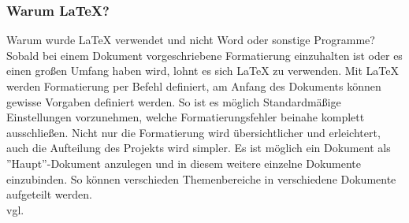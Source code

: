 \subsubsection{Warum LaTeX?}
\label{sec:WarumLaTeX} 
Warum wurde LaTeX verwendet und nicht Word oder sonstige Programme? Sobald bei einem Dokument vorgeschriebene Formatierung einzuhalten ist oder es einen großen Umfang haben wird, lohnt es sich LaTeX zu verwenden. Mit LaTeX werden Formatierung per Befehl definiert, am Anfang des Dokuments können gewisse Vorgaben definiert werden. So ist es möglich Standardmäßige Einstellungen vorzunehmen, welche Formatierungsfehler beinahe komplett ausschließen. Nicht nur die Formatierung wird übersichtlicher und erleichtert, auch die Aufteilung des Projekts wird simpler. Es ist möglich ein Dokument als ''Haupt''-Dokument anzulegen und in diesem weitere einzelne Dokumente einzubinden. So können verschieden Themenbereiche in verschiedene Dokumente aufgeteilt werden. \\vgl. \cite{TechnologieLaTeX} 